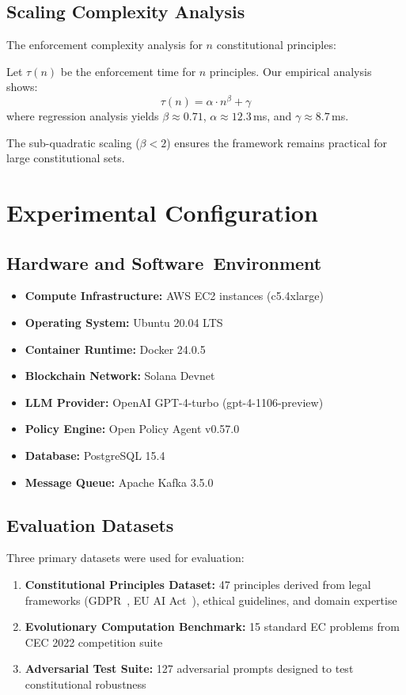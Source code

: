 \documentclass[10pt,twocolumn]{article}
\theoremstyle{definition}
\begin{document}
\subsection{Scaling Complexity Analysis}
The enforcement complexity analysis for $n$ constitutional principles:

Let $\tau(n)$ be the enforcement time for $n$ principles. Our empirical analysis shows:
\[\tau(n) = \alpha \cdot n^{\beta} + \gamma\]
where regression analysis yields $\beta \approx 0.71$, $\alpha \approx 12.3$\,ms, and $\gamma \approx 8.7$\,ms.

The sub-quadratic scaling ($\beta < 2$) ensures the framework remains practical for large constitutional sets.

\section{Experimental Configuration}
\label{sec:appendix_experimental}

\subsection{Hardware and Software~Environment}
\begin{itemize}[leftmargin=*,topsep=2pt,itemsep=2pt,parsep=0pt]
    \item \textbf{Compute Infrastructure:} AWS EC2 instances (c5.4xlarge)
    \item \textbf{Operating System:} Ubuntu 20.04 LTS
    \item \textbf{Container Runtime:} Docker 24.0.5
    \item \textbf{Blockchain Network:} Solana Devnet
    \item \textbf{LLM Provider:} OpenAI GPT-4-turbo (gpt-4-1106-preview)
    \item \textbf{Policy Engine:} Open Policy Agent v0.57.0
    \item \textbf{Database:} PostgreSQL 15.4
    \item \textbf{Message Queue:} Apache Kafka 3.5.0
\end{itemize}

\subsection{Evaluation Datasets}
Three primary datasets were used for evaluation:

\begin{enumerate}
    \item \textbf{Constitutional Principles Dataset:} 47 principles derived from legal frameworks (GDPR~\cite{gdpr2016}, EU AI Act~\cite{eu2024ai}), ethical guidelines, and domain expertise
    \item \textbf{Evolutionary Computation Benchmark:} 15 standard EC problems from CEC 2022 competition suite
    \item \textbf{Adversarial Test Suite:} 127 adversarial prompts designed to test constitutional robustness
\end{enumerate}
\end{document}
